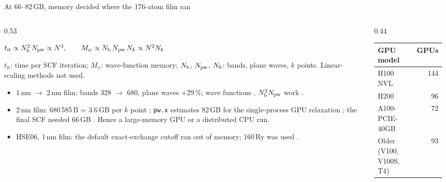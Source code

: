 \begin{frame}[t]{At 66--82\,GB, memory decided where the 176-atom film ran}
  \thirteenTop\thirteendense
  \begin{columns}[T,onlytextwidth]
    \begin{column}{0.53\textwidth}
      {\centering$t_{\mathrm{it}} \propto N_{\mathrm{b}}^{2}\,N_{\mathrm{pw}} \propto N^{3}, \qquad
         M_{\psi} \propto N_{\mathrm{b}}\,N_{\mathrm{pw}}\,N_{k} \propto N^{2}N_{k}$\par}
      \vspace{0.8mm}
      {\scriptsize\color{inkgrey} $t_{\mathrm{it}}$: time per SCF iteration; $M_{\psi}$: wave-function memory;
        $N_{\mathrm{b}}$, $N_{\mathrm{pw}}$, $N_{k}$: bands, plane waves, $k$ points. Linear-scaling
        methods not used.\par}
      \vspace{1mm}
      \begin{itemize}
        \item 1\,nm $\to$ 2\,nm film: bands 328 $\to$ 680, plane waves +29\,\%; wave functions ,
          $N_{\mathrm{b}}^{2}N_{\mathrm{pw}}$ work  .
        \item 2\,nm film: 680\,585\,B = 3.6\,GB per $k$ point ;
          \texttt{pw.x} estimates 82\,GB for the single-process GPU relaxation ; the final SCF needed
          66\,GB . Hence a large-memory GPU or a distributed CPU run.
        \item HSE06, 1\,nm film: the default exact-exchange cutoff ran out of memory; 160\,Ry was used
          .
      \end{itemize}
    \end{column}
    \begin{column}{0.44\textwidth}
      {\footnotesize
      \begin{tabular}{@{}lr@{}}
        \toprule
        GPU model & GPUs \\
        \midrule
        H100 NVL & 144 \\
        H200 & 96 \\
        A100-PCIE-40GB & 72 \\
        Older (V100, V100S, T4) & 93 \\

\end{tabular}}
\end{column}
\end{columns}
\end{frame}
